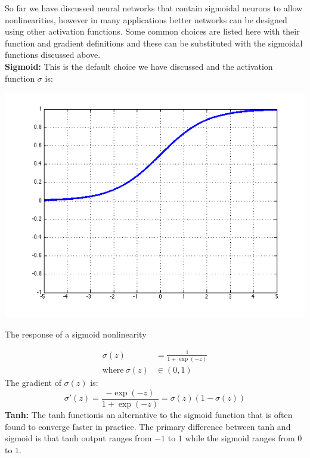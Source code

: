 \documentclass{tufte-handout}
\begin{document}
So far we have discussed neural networks that contain sigmoidal neurons to allow nonlinearities, however in many applications better networks can be designed using other activation functions. Some common choices are listed here with their function and gradient definitions and these can be substituted with the sigmoidal functions discussed above.
$$ $$
\textbf{Sigmoid:} This is the default choice we have discussed and the activation function $\sigma$ is:
\begin{marginfigure}%
  \includegraphics[width=\linewidth]{graph_sigmoid}
  \caption{The response of a sigmoid nonlinearity}
  \label{fig:graph_sigmoid}
\end{marginfigure}
\begin{align*}
  \sigma(z) &= \frac{1}{1 + \operatorname{exp}(-z)}\\
  \text{where}~\sigma(z) &\in (0, 1)
\end{align*}
The gradient of $ \sigma(z) $ is:
$$ \sigma'(z) = \frac{- \operatorname{exp}(-z)}{1 +  \operatorname{exp}(-z)} = \sigma(z) (1 - \sigma(z))$$
\textbf{Tanh:} The tanh functionis an alternative to the sigmoid function that is often found to converge faster in practice. The primary difference between tanh and sigmoid is that tanh output ranges from $-1$ to $1$ while the sigmoid ranges from $0$ to $1$.
\end{document}

